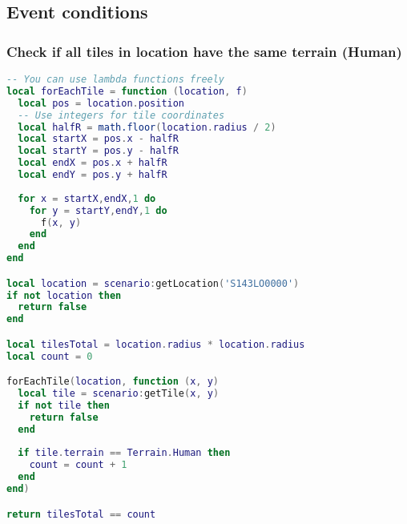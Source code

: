 \subsection{Event conditions}
\subsubsection{Check if all tiles in location have the same terrain (Human)}
\begin{center}
\begin{lstlisting}[language=Lua]
-- You can use lambda functions freely
local forEachTile = function (location, f)
  local pos = location.position
  -- Use integers for tile coordinates
  local halfR = math.floor(location.radius / 2)
  local startX = pos.x - halfR
  local startY = pos.y - halfR
  local endX = pos.x + halfR
  local endY = pos.y + halfR
  
  for x = startX,endX,1 do
    for y = startY,endY,1 do
      f(x, y)
    end
  end
end

local location = scenario:getLocation('S143LO0000')
if not location then
  return false
end

local tilesTotal = location.radius * location.radius
local count = 0

forEachTile(location, function (x, y)
  local tile = scenario:getTile(x, y)
  if not tile then
    return false
  end
  
  if tile.terrain == Terrain.Human then
    count = count + 1
  end
end)

return tilesTotal == count
\end{lstlisting}
\end{center}